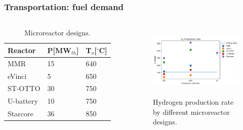 \begin{frame}
\frametitle{Transportation: fuel demand}
\begin{columns}
    \column[t]{4.5cm}
	\begin{table}[!htb]
		\centering
	    \caption{Microreactor designs.}
		\begin{tabular}{l|ll}
		\hline
		Reactor      & P[MW$_{th}$] & T$_o$[$^\circ$C]\\ \hline
		MMR          & 15         & 640             \\
		eVinci       & 5          & 650             \\
		ST-OTTO      & 30         & 750             \\
		U-battery    & 10         & 750             \\
		Starcore     & 36         & 850             \\ \hline
        \end{tabular}
	\end{table}

	\column[t]{5.5cm}
	\begin{figure}[htbp!]
		\begin{center}
			\includegraphics[height=3.5cm]{images/reactors-by-hour1}
		\end{center}
		\caption{Hydrogen production rate by different microreactor designs.}
	\end{figure}

\end{columns}
\end{frame}


